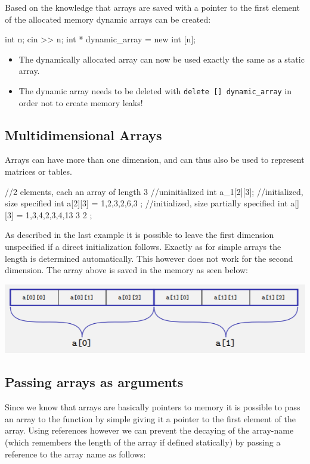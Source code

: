 \documentclass[10pt,a4paper]{scrartcl}
\begin{document}
\begin{multicols*}{2}
Based on the knowledge that arrays are saved with a pointer to the first element of the allocated memory dynamic arrays can be created:

\begin{TPCpp}
int n;
cin >> n;
int * dynamic_array = new int [n];
\end{TPCpp}

\begin{itemize}
\item The dynamically allocated array can now be used exactly the same as a static array.
\item The dynamic array needs to be deleted with \verb+delete [] dynamic_array+ in order not to create memory leaks!
\end{itemize}

\subsection{Multidimensional Arrays}

Arrays can have more than one dimension, and can thus also be used to represent matrices or tables. 

\begin{TPCpp}
//2 elements, each an array of length 3
//uninitialized
int a_1[2][3];
//initialized, size specified
int a[2][3] = {
	{1,2,3},{2,6,3}
};
//initialized, size partially specified
int a[][3] = {
	{1,3,4},{2,3,4},{13 3 2}
};
\end{TPCpp}

As described in the last example it is possible to leave the first dimension unspecified if a direct initialization follows. Exactly as for simple arrays the length is determined automatically. This however does not work for the second dimension.
The array above is saved in the memory as seen below:

\includegraphics[width=\linewidth]{Pictures/2DArray}

\subsection{Passing arrays as arguments}

Since we know that arrays are basically pointers to memory it is possible to pass an array to the function by simple giving it a pointer to the first element of the array. Using references however we can prevent the decaying of the array-name (which remembers the length of the array if defined statically) by passing a reference to the array name as follows:


\end{multicols*}
\end{document}
